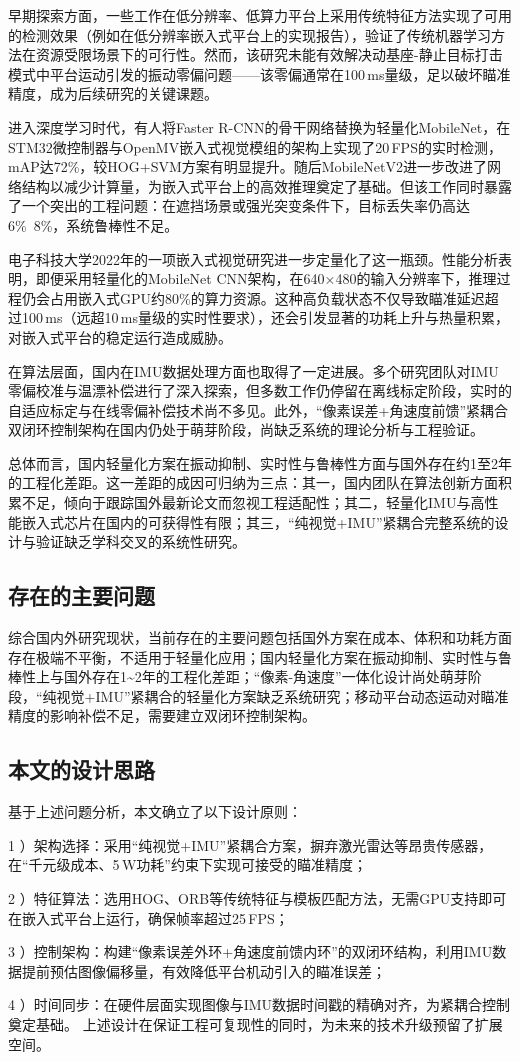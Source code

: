 早期探索方面，一些工作在低分辨率、低算力平台上采用传统特征方法实现了可用的检测效果（例如在低分辨率嵌入式平台上的实现报告），验证了传统机器学习方法在资源受限场景下的可行性。然而，该研究未能有效解决动基座-静止目标打击模式中平台运动引发的振动零偏问题——该零偏通常在100\,ms量级，足以破坏瞄准精度，成为后续研究的关键课题\cite{Liu2018DeepLearning}。

进入深度学习时代，有人将Faster R-CNN的骨干网络替换为轻量化MobileNet，在STM32微控制器与OpenMV嵌入式视觉模组的架构上实现了20\,FPS的实时检测，mAP达72\%，较HOG+SVM方案有明显提升。随后MobileNetV2\cite{Sandler2018MobileNetV2}进一步改进了网络结构以减少计算量，为嵌入式平台上的高效推理奠定了基础。但该工作同时暴露了一个突出的工程问题：在遮挡场景或强光突变条件下，目标丢失率仍高达6\%~8\%，系统鲁棒性不足。

电子科技大学2022年的一项嵌入式视觉研究进一步定量化了这一瓶颈。性能分析表明，即便采用轻量化的MobileNet CNN架构，在640×480的输入分辨率下，推理过程仍会占用嵌入式GPU约80\%的算力资源。这种高负载状态不仅导致瞄准延迟超过100\,ms（远超10\,ms量级的实时性要求），还会引发显著的功耗上升与热量积累，对嵌入式平台的稳定运行造成威胁。

在算法层面，国内在IMU数据处理方面也取得了一定进展。多个研究团队对IMU零偏校准与温漂补偿进行了深入探索，但多数工作仍停留在离线标定阶段，实时的自适应标定与在线零偏补偿技术尚不多见。此外，``像素误差+角速度前馈''紧耦合双闭环控制架构在国内仍处于萌芽阶段，尚缺乏系统的理论分析与工程验证。

总体而言，国内轻量化方案在振动抑制、实时性与鲁棒性方面与国外存在约1至2年的工程化差距。这一差距的成因可归纳为三点：其一，国内团队在算法创新方面积累不足，倾向于跟踪国外最新论文而忽视工程适配性；其二，轻量化IMU与高性能嵌入式芯片在国内的可获得性有限；其三，``纯视觉+IMU''紧耦合完整系统的设计与验证缺乏学科交叉的系统性研究。
\subsection{存在的主要问题}
综合国内外研究现状，当前存在的主要问题包括国外方案在成本、体积和功耗方面存在极端不平衡，不适用于轻量化应用；国内轻量化方案在振动抑制、实时性与鲁棒性上与国外存在1\textasciitilde{}2年的工程化差距；``像素-角速度''一体化设计尚处萌芽阶段，``纯视觉+IMU''紧耦合的轻量化方案缺乏系统研究；移动平台动态运动对瞄准精度的影响补偿不足，需要建立双闭环控制架构。
\subsection{本文的设计思路}
基于上述问题分析，本文确立了以下设计原则：\par
1 ）架构选择：采用``纯视觉+IMU''紧耦合方案，摒弃激光雷达等昂贵传感器，在``千元级成本、5\,W功耗''约束下实现可接受的瞄准精度；\par
2 ）特征算法：选用HOG、ORB等传统特征与模板匹配方法，无需GPU支持即可在嵌入式平台上运行，确保帧率超过25\,FPS；\par
3 ）控制架构：构建``像素误差外环+角速度前馈内环''的双闭环结构，利用IMU数据提前预估图像偏移量，有效降低平台机动引入的瞄准误差；\par
4 ）时间同步：在硬件层面实现图像与IMU数据时间戳的精确对齐，为紧耦合控制奠定基础。
上述设计在保证工程可复现性的同时，为未来的技术升级预留了扩展空间。
